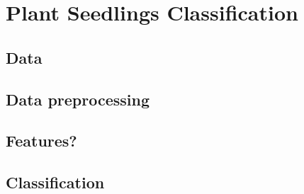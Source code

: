 \section{Plant Seedlings Classification}
\subsection{Data}
\subsection{Data preprocessing}
\subsection{Features?}
\subsection{Classification}
